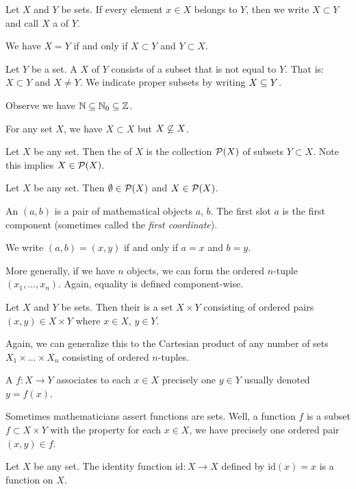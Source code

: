 Let $X$ and $Y$ be sets. If every element $x\in X$ belongs to $Y$, then
we write $X\subset Y$ and call $X$ a  of $Y$.

 We have $X=Y$ if and only if $X\subset Y$ and $Y\subset X$.

Let $Y$ be a set. A  $X$ of $Y$ consists of a
subset that is not equal to $Y$. That is: $X\subset Y$ and $X\neq Y$. We
indicate proper subsets by writing $X\propersubset Y$.

 Observe we have $\NN\propersubset\NN_{0}\propersubset\ZZ$.

 For any set $X$, we have $X\subset X$ but
$X\not\propersubset X$.

Let $X$ be any set. Then the  of $X$ is the collection
$\mathcal{P}(X)$ of subsets $Y\subset X$. Note this implies
$X\in\mathcal{P}(X)$. 

Let $X$ be any set. Then $\emptyset\in\mathcal{P}(X)$ and
$X\in\mathcal{P}(X)$.

An  $(a,b)$ is a pair of mathematical objects $a$,
$b$. The first slot $a$ is the first component (sometimes called
the \emph{first coordinate}).

We write $(a,b)=(x,y)$ if and only if $a=x$ and $b=y$.

More generally, if we have $n$ objects, we can form the ordered
$n$-tuple $(x_{1},\dots,x_{n})$. Again, equality is defined
component-wise. 

Let $X$ and $Y$ be sets. Then their  is a set
$X\times Y$ consisting of ordered pairs $(x,y)\in X\times Y$ where $x\in
X$, $y\in Y$.

Again, we can generalize this to the Cartesian product of any number of
sets $X_1\times\dots\times X_n$ consisting of ordered $n$-tuples.

A  $f\colon X\to Y$ associates to each $x\in X$
precisely one $y\in Y$ usually denoted $y=f(x)$. 

Sometimes mathematicians assert functions are sets. Well, a function $f$
is a subset $f\subset X\times Y$ with the property for each $x\in X$, we
have precisely one ordered pair $(x,y)\in f$.

Let $X$ be any set.
The identity function $\mathrm{id}\colon X\to X$ defined by
$\mathrm{id}(x)=x$ is a function on $X$.

